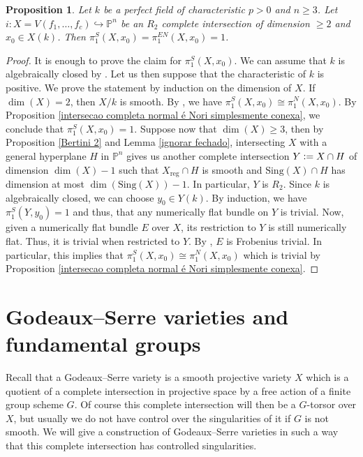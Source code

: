 \documentclass[a4paper,12pt]{amsart}
\newtheorem{proposition}[definition]{Proposition}
\numberwithin{equation}{section}
\newcommand{\defeq}{\vcentcolon=}
\renewcommand{\geq}{\geqslant}
\renewcommand{\_}{\rule{0.25cm}{0.4pt}}
\begin{document}
\begin{proposition}\label{intersecao completa normal é S simplesmente conexa}
Let $k$ be a perfect field of characteristic $p>0$ and $n\geq 3$. Let $i\colon X=V(f_{1},\dots,f_{c})\hookrightarrow \mathbb{P}^{n}$ be an $R_{2}$ complete intersection of dimension $\geq 2$ and $x_{0}\in X(k)$. Then $\pi_{1}^{S}(X,x_{0})=\pi_{1}^{EN}(X,x_{0})=1$.
\end{proposition}
\begin{proof}
    It is enough to prove the claim for $\pi_{1}^{S}(X,x_{0})$. We can assume that $k$ is algebraically closed by \cite[Proposition 5.8.(4)]{li2026basechangefundamentalgroup}. Let us then suppose that the characteristic of $k$ is positive. We prove the statement by induction on the dimension of $X$. If $\dim(X)=2$, then $X/k$ is smooth. By \cite[Corollary 8.3]{Langer2012-ap}, we have $\pi_{1}^{S}(X,x_{0})\cong \pi_{1}^{N}(X,x_{0})$. By Proposition \ref{intersecao completa normal é Nori simplesmente conexa}, we conclude that $\pi_{1}^{S}(X,x_{0})=1$. Suppose now that $\dim(X)\geq 3$, then by Proposition \ref{Bertini 2} and Lemma \ref{ignorar fechado}, intersecting $X$ with a general hyperplane $H$ in $\mathbb{P}^{n}$ gives us another complete intersection $Y\defeq X\cap H$ of dimension $\dim(X)-1$ such that $X_{\text{reg}}\cap H$ is smooth and $\text{Sing}(X)\cap H$ has dimension at most $\dim(\text{Sing}(X))-1$. In particular, $Y$ is $R_{2}$. Since $k$ is algebraically closed, we can choose $y_{0}\in Y(k)$. By induction, we have $\pi_{1}^{S}(Y,y_{0})=1$ and thus, that any numerically flat bundle on $Y$ is trivial. Now, given a numerically flat bundle $E$ over $X$, its restriction to $Y$ is still numerically flat. Thus, it is trivial when restricted to $Y$. By \cite[Theorem 2.1]{ASENS_2014__47_4_833_0}, $E$ is Frobenius trivial. In particular, this implies that $\pi_{1}^{S}(X,x_{0})\cong \pi_{1}^{N}(X,x_{0})$ which is trivial by Proposition \ref{intersecao completa normal é Nori simplesmente conexa}.
\end{proof}

\section{Godeaux--Serre varieties and fundamental groups}\label{4}

Recall that a Godeaux--Serre variety is a smooth projective variety $X$ which is a quotient of a complete intersection in projective space by a free action of a finite group scheme $G$. Of course this complete intersection will then be a $G$-torsor over $X$, but usually we do not have control over the singularities of it if $G$ is not smooth. We will give a construction of Godeaux--Serre varieties in such a way that this complete intersection has controlled singularities.
\end{document}
